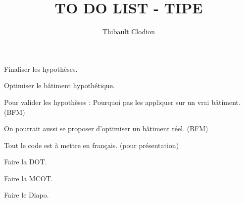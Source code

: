 \documentclass{article}
\title{TO DO LIST - TIPE}
\author{Thibault Clodion}
\newcommand{\cmark}{\ding{51}}%
\newcommand{\done}{\rlap{$\square$}{\raisebox{2pt}{\large\hspace{1pt}\cmark}}%
\hspace{-2.5pt}}
\begin{document}
\maketitle %

\begin{todolist}
    \item[\done] Finaliser les hypothèses.
    \item Optimiser le bâtiment hypothétique.
    \item Pour valider les hypothèses : Pourquoi pas les appliquer sur un vrai bâtiment. (BFM)
    \item On pourrait aussi se proposer d'optimiser un bâtiment réel. (BFM)
    \item Tout le code est à mettre en français. (pour présentation)
    \item Faire la DOT.
    \item Faire la MCOT.
    \item Faire le Diapo.
\end{todolist}
\end{document}
